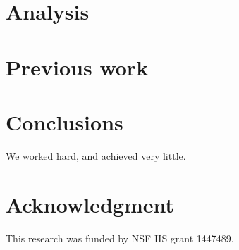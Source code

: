 \documentclass[10pt]{proc}
\begin{document}
\section{Analysis}\label{analysis}

\section{Previous work}\label{previous work}

\section{Conclusions}\label{conclusions}
We worked hard, and achieved very little.

\section*{Acknowledgment}
This research was funded by NSF IIS grant 1447489.




\end{document}
